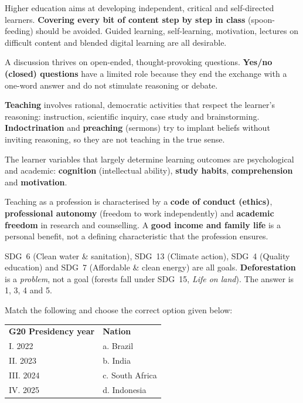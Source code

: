 Higher education aims at developing independent, critical and self-directed learners. \textbf{Covering every bit of content step by step in class} (spoon-feeding) should be avoided. Guided learning, self-learning, motivation, lectures on difficult content and blended digital learning are all desirable.

A discussion thrives on open-ended, thought-provoking questions. \textbf{Yes/no (closed) questions} have a limited role because they end the exchange with a one-word answer and do not stimulate reasoning or debate.

\textbf{Teaching} involves rational, democratic activities that respect the learner's reasoning: instruction, scientific inquiry, case study and brainstorming. \textbf{Indoctrination} and \textbf{preaching} (sermons) try to implant beliefs without inviting reasoning, so they are not teaching in the true sense.

The learner variables that largely determine learning outcomes are psychological and academic: \textbf{cognition} (intellectual ability), \textbf{study habits}, \textbf{comprehension} and \textbf{motivation}.

Teaching as a profession is characterised by a \textbf{code of conduct (ethics)}, \textbf{professional autonomy} (freedom to work independently) and \textbf{academic freedom} in research and counselling. A \textbf{good income and family life} is a personal benefit, not a defining characteristic that the profession ensures.

SDG~6 (Clean water \& sanitation), SDG~13 (Climate action), SDG~4 (Quality education) and SDG~7 (Affordable \& clean energy) are all goals. \textbf{Deforestation} is a \emph{problem}, not a goal (forests fall under SDG~15, \emph{Life on land}). The answer is 1, 3, 4 and 5.

Match the following and choose the correct option given below:\\[2pt]
\begin{tabular}{@{}ll@{}}
\textbf{G20 Presidency year} & \textbf{Nation}\\
I. 2022 & a. Brazil\\
II. 2023 & b. India\\
III. 2024 & c. South Africa\\
IV. 2025 & d. Indonesia\\
\end{tabular}

